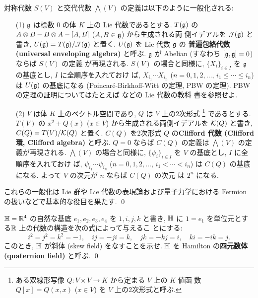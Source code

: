 \documentclass[12pt,twoside]{jarticle}
\begin{document}
\begin{guide}
  対称代数 $S(V)$ と交代代数 $\bigwedge(V)$ の定義は以下のように一般化される:
  \begin{itemize}
  \item[(1)] ${\mathfrak g}$ は標数 $0$ の体 $K$ 上の Lie 代数であるとする.
    $T({\mathfrak g})$ の $A\otimes B - B\otimes A - [A,B]$ ($A,B\in{\mathfrak g}$) から生成される両
    側イデアルを ${\mathcal J}({\mathfrak g})$ と書き,
    $U({\mathfrak g})=T({\mathfrak g})/{\mathcal J}({\mathfrak g})$ と置く.
    $U({\mathfrak g})$ を Lie 代数 ${\mathfrak g}$ の
    {\bf 普遍包絡代数 (universal enveloping algebra)} と呼ぶ.
    ${\mathfrak g}$ が Abelian (すなわち $[{\mathfrak g},{\mathfrak g}]=0$) ならば $S(V)$ の定義
    が再現される.
    $S(V)$ の場合と同様に,
    $\{X_i\}_{i\in I}$ を ${\mathfrak g}$ の基底とし, $I$ に全順序を入れておけ
    ば, $X_{i_1}\cdots X_{i_n}$ ($n=0,1,2,\ldots$, $i_1\le\cdots\le i_n$) は
    $U({\mathfrak g})$ の基底になる (Poincar\'e-Birkhoff-Witt の定理, PBW の定理).
    PBW の定理の証明についてはたとえば \cite{tanisaki} などの Lie 代数の教科
    書を参照せよ.
  \item[(2)] $V$ は体 $K$ 上のベクトル空間であり, $Q$ は $V$ 上の2次形式%
    \footnote{ある双線形写像 $Q:V\times V\to K$ から定まる $V$ 上の $K$ 値函
      数 $Q[x]=Q(x,x)$ ($x\in V$) を $V$ 上の2次形式と呼ぶ.}%
    であるとする. 
    $T(V)$ の $x^2 + Q(x)$ ($x\in V$) から生成される両側イデアルを ${\mathcal K}(Q)$ 
    と書き, $C(Q)=T(V)/{\mathcal K}(Q)$ と置く.
    $C(Q)$ を2次形式 $Q$ の{\bf Clifford 代数 (Clifford 環, Clifford algebra)} 
    と呼ぶ. 
    $Q=0$ ならば $C(Q)$ の定義は $\bigwedge(V)$ の定義が再現される.
    $\bigwedge(V)$ の場合と同様に,
    $\{\psi_i\}_{i\in I}$ を $V$ の基底とし, $I$ に全順序を入れておけ
    ば, $\psi_{i_1}\cdots\psi_{i_n}$ ($n=0,1,2,\ldots$, $i_1<\cdots< i_n$) 
    は $C(Q)$ の基底になる.  よって $V$ の次元が $n$ ならば $C(Q)$ の次元
    は $2^n$ になる. 
  \end{itemize}
  これらの一般化は Lie 群や Lie 代数の表現論および量子力学における Fermion 
  の扱いなどで基本的な役目を果たす.
  \qed
\end{guide}

\begin{question}
  ${\mathbb H}={\mathbb R}^4$ の自然な基底 $e_1,e_2,e_3,e_4$ を $1,i,j,k$ と書き,
  ${\mathbb H}$ に $1=e_1$ を単位元とする${\mathbb R}$ 上の代数の構造を次の式によって与えるこ
  とにする:
  \begin{equation*}
    i^2 = j^2 = k^2 = -1, \quad
    ij=-ji=k,\quad jk=-kj=i, \quad ki=-ik=j.
  \end{equation*}
  このとき, ${\mathbb H}$ が斜体 (skew field) をなすことを示せ.
  ${\mathbb H}$ を Hamilton の{\bf 四元数体 (quaternion field)} と呼ぶ. \qed
\end{question}
\end{document}
